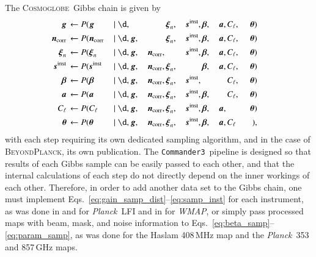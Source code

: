\documentclass[twocolumn]{../../common/aa}
\def\WMAP{\emph{WMAP}}
\def\Planck{\emph{Planck}}
\def\commanderthree{\texttt{Commander3}}
\newcommand{\g}[0]{\vec{g}}
\newcommand{\bp}{\textsc{BeyondPlanck}}
\newcommand{\cosmoglobe}{\textsc{Cosmoglobe}}
\newcommand{\ncorr}{\vec n_\mathrm{corr}}
\begin{document}
The \cosmoglobe\ Gibbs chain is given by
\begin{alignat}{10}
\label{eq:gain_samp_dist}\g &\,\leftarrow          P(\g&\,               \mid \d, &\,    &          &\,\boldsymbol\xi_n,  &\,\boldsymbol s^\mathrm{inst}, &\,\boldsymbol\beta, &\,\boldsymbol a, &\,C_{\ell},&\,\boldsymbol\theta)\\
\label{eq:ncorr_samp_dist} \ncorr &\,\leftarrow    P(\ncorr&\,           \mid \d, &\,\g, &\,        &\,\boldsymbol\xi_n,  &\,\boldsymbol s^\mathrm{inst}, &\,\boldsymbol\beta, &\,\boldsymbol a, &\,C_{\ell},&\,\boldsymbol\theta)\\ 
\label{eq:xi_samp_dist} \boldsymbol\xi_n &\,\leftarrow        P(\boldsymbol\xi_n&\,            \mid \d, &\,\g, &\,\ncorr, &\,        &\,\boldsymbol s^\mathrm{inst}, &\,\boldsymbol\beta, &\,\boldsymbol a, &\,C_{\ell},&\,\boldsymbol\theta)\\
\label{eq:samp_inst}\boldsymbol s^\mathrm{inst} &\,\leftarrow                                 P(\boldsymbol s^\mathrm{inst}&\,             \mid \d, &\,\g, &\,\ncorr, &\,\boldsymbol\xi_n,  &\,      &\,\boldsymbol\beta, &\,\boldsymbol a, &\,C_{\ell},&\,\boldsymbol\theta)\\
\label{eq:beta_samp}\boldsymbol\beta &\,\leftarrow                     P(\boldsymbol\beta&\, \mid \d, &\,\g, &\,\ncorr, &\,\boldsymbol\xi_n,  &\,\boldsymbol s^\mathrm{inst}, &\,       &\,    &\,C_{\ell},&\,\boldsymbol\theta)\\
\boldsymbol a &\,\leftarrow                                   P(\boldsymbol a&\,               \mid \d, &\,\g, &\,\ncorr, &\,\boldsymbol\xi_n,  &\,\boldsymbol s^\mathrm{inst}, &\,\boldsymbol\beta, &\,    &\,C_{\ell},&\,\boldsymbol\theta)\\
C_{\ell} &\,\leftarrow                             P(C_{\ell}&\,         \mid \d, &\,\g, &\,\ncorr, &\,\boldsymbol\xi_n,  &\,\boldsymbol s^\mathrm{inst}, &\,\boldsymbol\beta, &\,\boldsymbol a,&\,\phantom{C_{\ell}}&\,\boldsymbol\theta)&\label{eq:cl_sampling}\\
\boldsymbol\theta &\,\leftarrow                             P(\boldsymbol\theta&\,         \mid \d, &\,\g, &\,\ncorr, &\,\boldsymbol\xi_n,  &\,\boldsymbol s^\mathrm{inst}, &\,\boldsymbol\beta, &\,\boldsymbol a,&\,C_\ell\phantom{,}&\phantom{\,\boldsymbol\theta})\label{eq:param_samp},
\end{alignat}
with each step requiring its own dedicated sampling algorithm, and in the case of \bp, its own publication. The \commanderthree\ pipeline is designed so that results of each Gibbs sample can be easily passed to each other, and that the internal calculations of each step do not directly depend on the inner workings of each other. Therefore, in order to add another data set to the Gibbs chain, one must implement Eqs.~\eqref{eq:gain_samp_dist}--\eqref{eq:samp_inst} for each instrument, as was done in \citet{bp01} and \citet{bp10} for \Planck\ LFI and in \citet{bp17} for \WMAP, or simply pass processed maps with beam, mask, and noise information to Eqs.~\eqref{eq:beta_samp}--\eqref{eq:param_samp}, as was done for the Haslam 408\,MHz map \citep{haslam1982,remazeilles2014} and the \Planck\ 353 and 857\,GHz maps.
\end{document}
